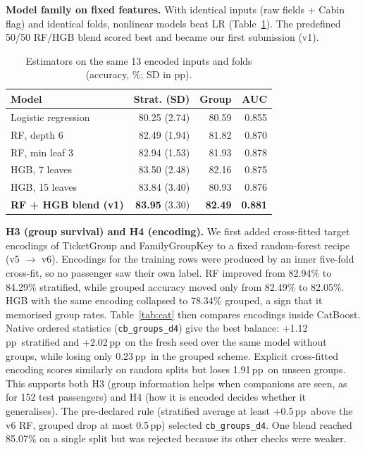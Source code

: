 \documentclass[10pt,twocolumn,letterpaper]{article}
\newcommand{\pp}{\,pp}
\begin{document}
\textbf{Model family on fixed features.} With identical inputs (raw fields + Cabin flag) and identical folds, nonlinear models beat LR (Table~\ref{tab:models}). The predefined 50/50 RF/HGB blend scored best and became our first submission (v1).

\begin{table}[t]
\centering\small
\caption{Estimators on the same 13 encoded inputs and folds (accuracy, \%; SD in pp).}
\label{tab:models}
\begin{tabular}{lrrr}
\toprule
Model & Strat. (SD) & Group & AUC\\
\midrule
Logistic regression & 80.25 (2.74) & 80.59 & 0.855\\
RF, depth 6 & 82.49 (1.94) & 81.82 & 0.870\\
RF, min leaf 3 & 82.94 (1.53) & 81.93 & 0.878\\
HGB, 7 leaves & 83.50 (2.48) & 82.16 & 0.875\\
HGB, 15 leaves & 83.84 (3.40) & 80.93 & 0.876\\
\textbf{RF + HGB blend (v1)} & \textbf{83.95} (3.30) & \textbf{82.49} & \textbf{0.881}\\
\bottomrule
\end{tabular}
\end{table}

\textbf{H3 (group survival) and H4 (encoding).} We first added cross-fitted target encodings of TicketGroup and FamilyGroupKey to a fixed random-forest recipe (v5 $\to$ v6). Encodings for the training rows were produced by an inner five-fold cross-fit, so no passenger saw their own label. RF improved from 82.94\% to 84.29\% stratified, while grouped accuracy moved only from 82.49\% to 82.05\%. HGB with the same encoding collapsed to 78.34\% grouped, a sign that it memorised group rates. Table~\ref{tab:cat} then compares encodings inside CatBoost. Native ordered statistics (\texttt{cb\_groups\_d4}) give the best balance: +1.12\pp\ stratified and +2.02\pp\ on the fresh seed over the same model without groups, while losing only 0.23\pp\ in the grouped scheme. Explicit cross-fitted encoding scores similarly on random splits but loses 1.91\pp\ on unseen groups. This supports both H3 (group information helps when companions are seen, as for 152 test passengers) and H4 (how it is encoded decides whether it generalises). The pre-declared rule (stratified average at least +0.5\pp\ above the v6 RF, grouped drop at most 0.5\pp) selected \texttt{cb\_groups\_d4}. One blend reached 85.07\% on a single split but was rejected because its other checks were weaker.
\end{document}
